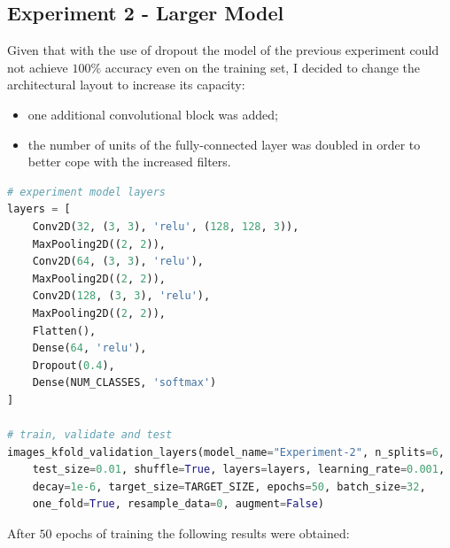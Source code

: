 \documentclass[11pt,a4paper]{article}
\begin{document}
\subsection{Experiment 2 - Larger Model}
Given that with the use of dropout the model of the previous experiment could not achieve $100\%$ accuracy even on the training set, I decided to change the architectural layout to increase its capacity:
\begin{itemize}
    \item one additional convolutional block was added;
    \item the number of units of the fully-connected layer was doubled in order to better cope with the increased filters.
\end{itemize}
\begin{lstlisting}[language=Python,frame=single]
# experiment model layers
layers = [
    Conv2D(32, (3, 3), 'relu', (128, 128, 3)),
    MaxPooling2D((2, 2)),
    Conv2D(64, (3, 3), 'relu'),
    MaxPooling2D((2, 2)),
    Conv2D(128, (3, 3), 'relu'),
    MaxPooling2D((2, 2)),
    Flatten(),
    Dense(64, 'relu'),
    Dropout(0.4),
    Dense(NUM_CLASSES, 'softmax')
]

# train, validate and test
images_kfold_validation_layers(model_name="Experiment-2", n_splits=6,
    test_size=0.01, shuffle=True, layers=layers, learning_rate=0.001,
    decay=1e-6, target_size=TARGET_SIZE, epochs=50, batch_size=32,
    one_fold=True, resample_data=0, augment=False)
\end{lstlisting}
After $50$ epochs of training the following results were obtained:
\end{document}
